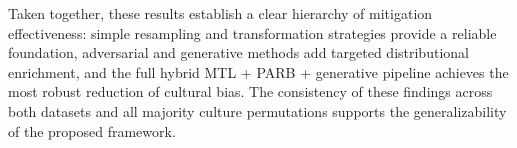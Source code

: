 Taken together, these results establish a clear hierarchy of mitigation effectiveness: simple resampling and transformation strategies provide a reliable foundation, adversarial and generative methods add targeted distributional enrichment, and the full hybrid MTL + PARB + generative pipeline achieves the most robust reduction of cultural bias. The consistency of these findings across both datasets and all majority culture permutations supports the generalizability of the proposed framework.


